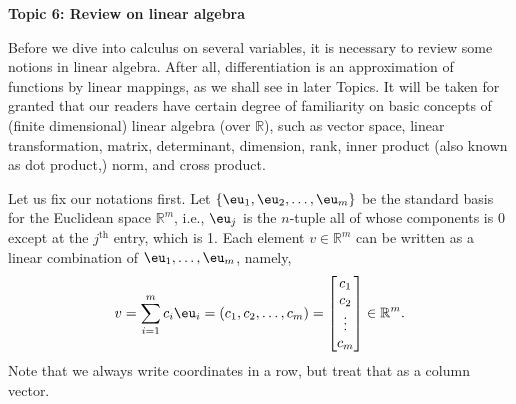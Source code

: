 \documentclass[11pt]{article}
\begin{document}
\begin{center}
  \textbf{Topic 6: Review on linear algebra}
\end{center}

Before we dive into calculus on several variables, it is necessary to review some notions in linear algebra.
After all, differentiation is an approximation of functions by linear mappings, as we shall see in later Topics.
It will be taken for granted that our readers have certain degree of familiarity on basic concepts of (finite dimensional) linear algebra (over $\mathbb{R}$), such as vector space, linear transformation, matrix, determinant, dimension, rank, inner product (also known as dot product,) norm, and cross product.

Let us fix our notations first.
Let $\{ \eu_1, \eu_2, \dots, \eu_m \}$ be the standard basis for the Euclidean space $\mathbb{R}^m$, i.e., $\eu_j$ is the $n$-tuple all of whose components is 0 except at the $j^\text{th}$ entry, which is 1.
Each element $v \in \mathbb{R}^m$ can be written as a linear combination of $\eu_1, \dots, \eu_m$, namely,
\[
  v = \sum_{i=1}^m c_i \eu_i = (c_1, c_2, \dots, c_m) = 
  \begin{bmatrix}
    c_1 \\ c_2 \\ \vdots \\ c_m
  \end{bmatrix} \in \mathbb{R}^m.
\]
Note that we always write coordinates in a row, but treat that as a column vector.
\end{document}
